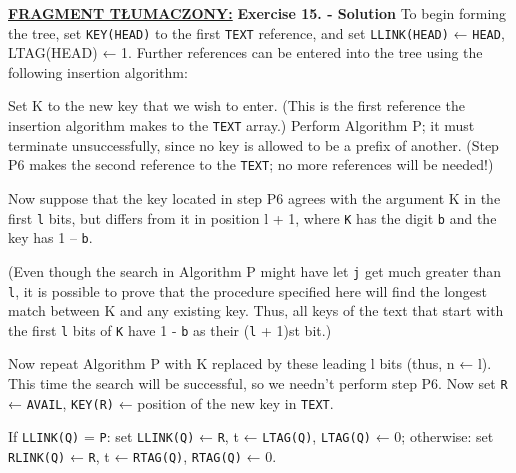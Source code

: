 	\ifsourcematerial	
	\begin{displayquote}
		\color{ao(english)}
		\underline{\textbf{FRAGMENT TŁUMACZONY:}} \newline
		\textbf{Exercise 15. - Solution} \newline
		To begin forming the tree, set \texttt{KEY(HEAD)} to the first \texttt{TEXT} reference, and set \texttt{LLINK(HEAD)} ← \texttt{HEAD}, LTAG(HEAD) ← 1. Further references can be entered into the tree using the following insertion algorithm: \newline 
		
		Set K to the new key that we wish to enter. (This is the first reference the insertion algorithm makes to the \texttt{TEXT} array.) \newline
		Perform Algorithm P; it must terminate unsuccessfully, since no key is allowed to be a prefix of another.
		(Step P6 makes the second reference to the \texttt{TEXT}; no more references will be
		needed!) \newline
		
		Now suppose that the key located in step P6 agrees with the
		argument K in the first \texttt{l} bits, but differs from it in position l + 1, where \texttt{K} has the digit \texttt{b} and the key has 1 – \texttt{b}. \newline 
		
		(Even though the search in Algorithm P might have let \texttt{j} get much greater than \texttt{l}, it is possible to prove that the procedure specified here will find the longest match between K and any existing key. Thus, all keys of the text that start with the first \texttt{l} bits of \texttt{K} have 1 - \texttt{b} as their (\texttt{l} + 1)st bit.) \newline
		
		Now repeat Algorithm P with K replaced by these leading l bits (thus, n ← l). This time the search will be successful, so we needn’t perform step P6. \newline
		Now set \texttt{R} ← \texttt{AVAIL}, \texttt{KEY(R)} ← position of the new key in \texttt{TEXT}. \newline
		
		If \texttt{LLINK(Q)} = \texttt{P}: \newline
		set \texttt{LLINK(Q)} ← \texttt{R}, t ← \texttt{LTAG(Q)}, \texttt{LTAG(Q)} ← 0; \newline
		otherwise: \newline
		set \texttt{RLINK(Q)} ← \texttt{R}, t ← \texttt{RTAG(Q)}, \texttt{RTAG(Q)} ← 0. \newline
		

\end{displayquote}
